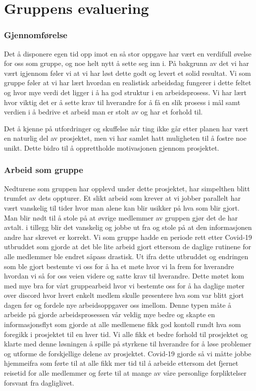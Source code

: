 \section{Gruppens evaluering}

\subsubsection{Gjennomførelse} 

Det å disponere egen tid opp imot en så stor oppgave har vært en verdifull øvelse for oss som gruppe, og noe helt nytt å sette seg inn i. På bakgrunn av det vi har vært igjennom føler vi at vi har løst dette godt og levert et solid resultat. Vi som gruppe føler at vi har lært hvordan en realistisk arbeidsdag fungerer i dette feltet og hvor mye verdi det ligger i å ha god struktur i en arbeidsprosess. Vi har lært hvor viktig det er å sette krav til hverandre for å få en slik prosess i mål samt verdien i å bedrive et arbeid man er stolt av og har et forhold til.

Det å kjenne på utfordringer og skuffelse når ting ikke går etter planen har vært en naturlig del av prosjektet, men vi har samlet hatt muligheten til å fostre noe unikt. Dette bidro til å opprettholde motivasjonen gjennom prosjektet.

\subsubsection{Arbeid som gruppe}

Nedturene som gruppen har opplevd under dette prosjektet, har simpelthen blitt trumfet av dets oppturer. Et slikt arbeid som krever at vi jobber parallelt har vært vanskelig til tider hvor man alene kan blir usikker på hva som blir gjort. Man blir nødt til å stole på at øvrige medlemmer av gruppen gjør det de har avtalt. i tillegg blir det vanskelig og jobbe ut fra og stole på at den informasjonen andre har skrevet er korrekt. Vi som gruppe hadde en periode rett etter Covid-19 utbruddet som gjorde at det ble lite arbeid gjort ettersom de daglige rutinene for alle medlemmer ble endret såpass drastisk. Ut ifra dette utbruddet og endringen som ble gjort bestemte vi oss for å ha et møte hvor vi la frem for hverandre hvordan vi så for oss veien videre og satte krav til hverandre. Dette møtet kom med mye bra for vårt gruppearbeid hvor vi bestemte oss for å ha daglige møter over discord hvor hvert enkelt medlem skulle presentere hva som var blitt gjort dagen før og fordele nye arbeidsoppgaver oss imellom. Denne typen måte å arbeide på gjorde arbeidsprosessen vår veldig mye bedre og skapte en informasjonsflyt som gjorde at alle medlemene fikk god kontoll rundt hva som foregikk i prosjektet til en hver tid. Vi alle fikk et bedre forhold til prosjektet og klarte med denne løsningen å spille på styrkene til hverandre for å løse problemer og utforme de forskjellige delene av prosjektet. Covid-19 
gjorde så vi måtte jobbe hjemmeifra som førte til at alle fikk mer tid til å arbeide ettersom det fjernet reisetid for alle medlemmer og førte til at mange av våre personlige forpliktelser forsvant fra dagliglivet.


